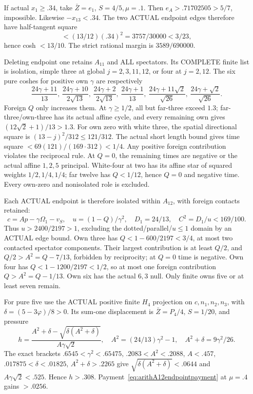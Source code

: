 \documentclass[11pt]{article}
\begin{document}
If actual \(x_1\ge.34\), take \(\bar Z=e_1\),
\(S=4/5,\mu=.1\).
Then \(e_A>.71702505>5/7\), impossible.
Likewise \(-x_{13}<.34\).
The two ACTUAL endpoint edges therefore have
half-tangent square
\[
                 <(13/12)(.34)^2=3757/30000<3/23 ,
\]
hence cosh \(<13/10\).
The strict rational margin is \(3589/690000\).

Deleting endpoint one retains \(A_{11}\) and
ALL spectators.
Its COMPLETE finite list is isolation, simple
three at global \(j=2,3,11,12\), or four at
\(j=2,12\).
The six pure coshes for positive own \(\gamma\)
are respectively
\[
 {\frac{24\gamma+11}{13}},\
 {\frac{24\gamma+10}{2\sqrt{13}}},\
 {\frac{24\gamma+2}{2\sqrt{13}}},\
 {\frac{24\gamma+1}{13}},\
 {\frac{24\gamma+11\sqrt2}{\sqrt{26}}},\
 {\frac{24\gamma+\sqrt2}{\sqrt{26}}} .
\]
Foreign \(Q\) only increases them.
At \(\gamma\ge1/2\), all but far-three exceed
\(1.3\); far-three/own-three has its actual
affine cycle, and every remaining own gives
\((12\sqrt2+1)/13>1.3\).
For own zero with white three, the spatial
directional square is \((13-j)^2/312\le121/312\).
The actual short length bound gives time square
\(<69(121)/(169\cdot312)<1/4\).
Any positive foreign contribution violates
the reciprocal rule.
At \(Q=0\), the remaining times are negative
or the actual affine \(1,2,5\) principal.
White-four at two has its affine star of
squared weights \(1/2,1/4,1/4\);
far twelve has \(Q<1/12\), hence \(Q=0\)
and negative time.
Every own-zero and nonisolated role is excluded.

Each ACTUAL endpoint is therefore isolated
within \(A_{12}\), with foreign contacts retained:
\[
 c=Ap-\gamma\Omega_1-v_S,\quad
 u=(1-Q)/\gamma^2,\quad D_1=24/13,\quad
 C^2=D_1/u<169/100 .
\]
Thus \(u>2400/2197>1\), excluding the
dotted/parallel/\(u\le1\) domain by an ACTUAL
edge bound.
Own three has \(Q<1-600/2197<3/4\),
at most two contacted spectator components.
Their largest contribution is at least \(Q/2\), and
\(Q/2>A^2=Q-7/13\), forbidden by reciprocity;
at \(Q=0\) time is negative.
Own four has \(Q<1-1200/2197<1/2\),
so at most one foreign contribution
\(Q>A^2=Q-1/13\).
Own six has the actual \(6,3\) null.
Only finite owns five or at least seven remain.

For pure five use the ACTUAL positive finite
\(H_4\) projection on \(c,n_1,n_2,n_3\),
with \(\delta=(5-3\varphi)/8>0\).
Its sum-one displacement is \(\bar Z=P_4/4\),
\(S=1/20\), and pressure
\[
 h={\frac{A^2+\delta-\sqrt{\delta(A^2+\delta)}}{A\gamma\sqrt2}},\quad
 A^2=(24/13)\gamma^2-1,\quad
 A^2+\delta=9\gamma^2/26 .
\]
The exact brackets
\(.6545<\gamma^2<.65475\),
\(.2083<A^2<.2088\), \(A<.457\),
\(.017875<\delta<.01825\),
\(A^2+\delta>.2265\)
give \(\sqrt{\delta(A^2+\delta)}<.0644\)
and \(A\gamma\sqrt2<.525\).
Hence \(h>.308\).
Payment~\eqref{eq:arithA12endpointpayment}
at \(\mu=.4\) gains \(>.0256\).
\end{document}
